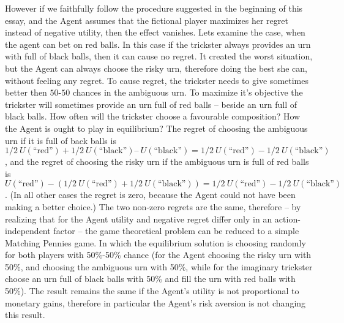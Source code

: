 \documentclass{article}
\begin{document}
However if we faithfully follow the procedure suggested in the beginning of this essay, and the Agent assumes that the fictional player maximizes her regret instead of negative utility, then the effect vanishes. 
Lets examine the case, when the agent can bet on red balls. In this case if the trickster always provides an urn with full of black balls, then it can cause no regret. It created the worst situation, but the Agent can always choose the risky urn, therefore doing the best she can, without feeling any regret.
To cause regret, the trickster needs to give sometimes better then $50$-$50$ chances in the ambiguous urn. To maximize it’s objective the trickster will sometimes provide an urn full of red balls -- beside an urn full of black balls.
How often will the trickster choose a favourable composition? How the Agent is ought to play in equilibrium? The regret of choosing the ambiguous urn if it is full of back balls is $1/2 \ U(\text{``red''})+ 1/2 \ U(\text{``black''}) – \ U(\text{``black''}) = 1/2 \ U(\text{``red''})- 1/2 \ U(\text{``black''})$, and the regret of choosing the risky urn if the ambiguous urn is full of red balls is $U(\text{``red''}) - (1/2 \ U(\text{``red''})+ 1/2 \ U(\text{``black''})) = 1/2 \ U(\text{``red''})- 1/2 \ U(\text{``black''})$. (In all other cases the regret is zero, because the Agent could not have been making a better choice.) The two non-zero regrets are the same, therefore -- by realizing that for the Agent utility and negative regret differ only in an action-independent factor -- the game theoretical problem can be reduced to a simple Matching Pennies game. In which the equilibrium solution is choosing randomly for both players with 50\%-50\% chance (for the Agent choosing the risky urn with 50\%, and choosing the ambiguous urn with 50\%, while for the imaginary trickster choose an urn full of black balls with 50\% and fill the urn with red balls with 50\%).
The result remains the same if the Agent’s utility is not proportional to monetary gains, therefore in particular the Agent’s risk aversion is not changing this result.
\end{document}
